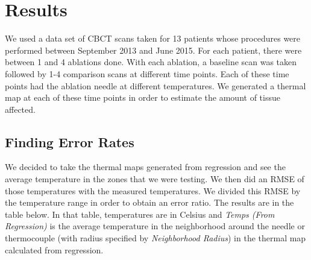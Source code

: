 \documentclass[]{spie}  %
\begin{document}
\section{Results}

We used a data set of CBCT scans taken for 13 patients whose procedures were performed between September 2013 and June 2015. For each patient, there were between 1 and 4 ablations done. With each ablation, a baseline scan was taken followed by 1-4 comparison scans at different time points. Each of these time points had the ablation needle at different temperatures. We generated a thermal map at each of these time points in order to estimate the amount of tissue affected. 

\subsection{Finding Error Rates}

We decided to take the thermal maps generated from regression and see the average temperature in the zones that we were testing. We then did an RMSE of those temperatures with the measured temperatures. We divided this RMSE by the temperature range in order to obtain an error ratio. The results are in the table below. In that table, temperatures are in Celsius and \textit{Temps (From Regression)} is the average temperature in the neighborhood around the needle or thermocouple (with radius specified by \textit{Neighborhood Radius}) in the thermal map calculated from regression. 
\end{document}
